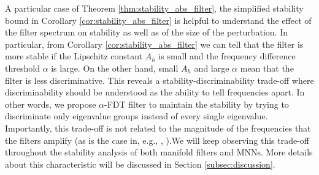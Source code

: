 A particular case of Theorem \ref{thm:stability_abs_filter}, the simplified stability bound in Corollary \ref{cor:stability_abs_filter} is helpful to understand the effect of the filter spectrum on stability as well as of the size of the perturbation. 
In particular, from Corollary \ref{cor:stability_abs_filter} we can tell that the filter is more stable if the Lipschitz constant $A_h$ is small and the frequency difference threshold $\alpha$ is large.
On the other hand, small $A_h$ and large $\alpha$ mean that the filter is less discriminative. This reveals a stability-discriminability trade-off where discriminability should be understood as the ability to tell frequencies apart. In other words, we propose $\alpha$-FDT filter to maintain the stability by trying to discriminate only eigenvalue groups instead of every single eigenvalue. Importantly, this trade-off is not related to the magnitude of the frequencies that the filters amplify (as is the case in, e.g., \cite{gama2020stability}, \cite{ruiz2020graphon}).We will keep observing this trade-off throughout the stability analysis of both manifold filters and MNNs. More details about this characteristic will be discussed in Section \ref{subsec:discussion}.




